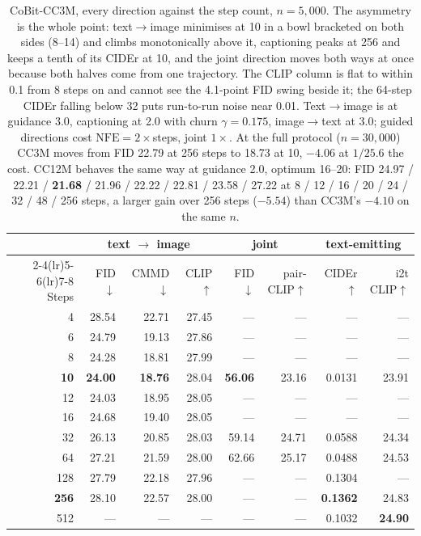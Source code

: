 \begin{table}[tb]
\centering
\footnotesize
\setlength{\tabcolsep}{5pt}
\begin{tabular}{rrrr@{\hspace{10pt}}rr@{\hspace{10pt}}rr}
\toprule
& \multicolumn{3}{c}{text $\rightarrow$ image} & \multicolumn{2}{c}{joint} & \multicolumn{2}{c}{text-emitting} \\
\cmidrule(lr){2-4}\cmidrule(lr){5-6}\cmidrule(lr){7-8}
Steps & FID$\downarrow$ & CMMD$\downarrow$ & CLIP$\uparrow$ & FID$\downarrow$ & pair-CLIP$\uparrow$ & CIDEr$\uparrow$ & i2t CLIP$\uparrow$ \\
\midrule
4   & 28.54 & 22.71 & 27.45 & --- & --- & --- & --- \\
6   & 24.79 & 19.13 & 27.86 & --- & --- & --- & --- \\
8   & 24.28 & 18.81 & 27.99 & --- & --- & --- & --- \\
\textbf{10}  & \textbf{24.00} & \textbf{18.76} & 28.04 & \textbf{56.06} & 23.16 & 0.0131 & 23.91 \\
12  & 24.03 & 18.95 & 28.05 & --- & --- & --- & --- \\
16  & 24.68 & 19.40 & 28.05 & --- & --- & --- & --- \\
32  & 26.13 & 20.85 & 28.03 & 59.14 & 24.71 & 0.0588 & 24.34 \\
64  & 27.21 & 21.59 & 28.00 & 62.66 & 25.17 & 0.0488 & 24.53 \\
128 & 27.79 & 22.18 & 27.96 & --- & --- & 0.1304 & --- \\
\textbf{256} & 28.10 & 22.57 & 28.00 & --- & --- & \textbf{0.1362} & 24.83 \\
512 & --- & --- & --- & --- & --- & 0.1032 & \textbf{24.90} \\
\bottomrule
\end{tabular}
\caption{CoBit-CC3M, every direction against the step count, $n{=}5{,}000$. The asymmetry is the
whole point: text$\rightarrow$image minimises at 10 in a bowl bracketed on both sides (8--14) and
climbs monotonically above it, captioning peaks at 256 and keeps a tenth of its CIDEr at 10, and
the joint direction moves both ways at once because both halves come from one trajectory. The CLIP
column is flat to within 0.1 from 8 steps on and cannot see the 4.1-point FID swing beside it; the
64-step CIDEr falling below 32 puts run-to-run noise near 0.01. Text$\rightarrow$image is at
guidance 3.0, captioning at 2.0 with churn $\gamma{=}0.175$, image$\rightarrow$text at 3.0; guided
directions cost $\mathrm{NFE}=2\times$steps, joint $1\times$. At the full protocol
($n{=}30{,}000$) CC3M moves from FID 22.79 at 256 steps to 18.73 at 10, $-4.06$ at $1/25.6$ the
cost. CC12M behaves the same way at guidance 2.0, optimum 16--20: FID 24.97 / 22.21 / \textbf{21.68} /
21.96 / 22.22 / 22.81 / 23.58 / 27.22 at 8 / 12 / 16 / 20 / 24 / 32 / 48 / 256 steps, a larger gain
over 256 steps ($-5.54$) than CC3M's $-4.10$ on the same $n$.}
\label{tab:app:image:steps}
\end{table}

